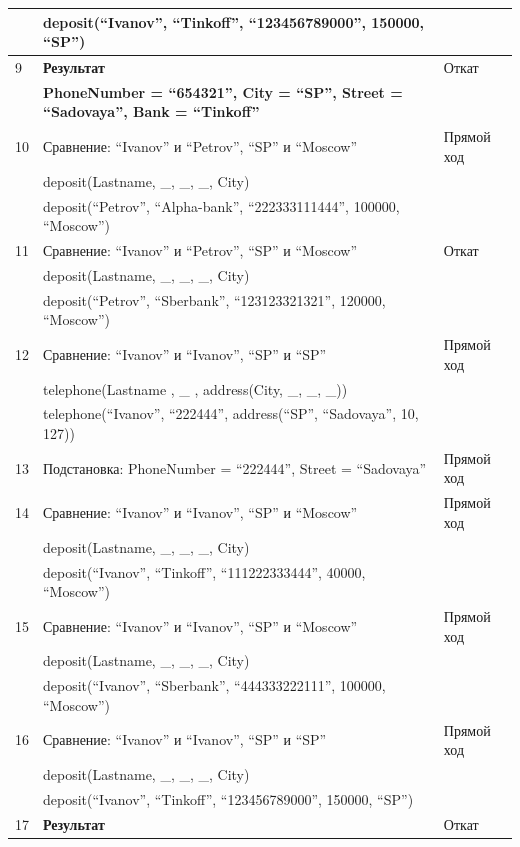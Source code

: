 {\begin{longtable}{|p{1.15cm}|p{8cm}|p{8cm}|}
      & deposit(``Ivanov'', ``Tinkoff'', ``123456789000'', 150000, ``SP'') & \\
    \hline
    9 & \textbf{Результат} & Откат \\
      & \textbf{PhoneNumber = ``654321'', City = ``SP'', Street = ``Sadovaya'', Bank = ``Tinkoff''} & \\
    \hline
    10 & Сравнение: ``Ivanov'' и ``Petrov'', ``SP'' и ``Moscow'' & Прямой ход \\
      & deposit(Lastname, \_, \_, \_, City) & \\
      & deposit(``Petrov'', ``Alpha-bank'', ``222333111444'', 100000, ``Moscow'') & \\
    \hline
    11 & Сравнение: ``Ivanov'' и ``Petrov'', ``SP'' и ``Moscow'' & Откат \\
      & deposit(Lastname, \_, \_, \_, City) & \\
      & deposit(``Petrov'', ``Sberbank'', ``123123321321'', 120000, ``Moscow'') & \\
    \hline
    12 & Сравнение: ``Ivanov'' и ``Ivanov'', ``SP'' и ``SP'' & Прямой ход \\
      & telephone(Lastname , \_ , address(City, \_, \_, \_)) & \\
      & telephone(``Ivanov'', ``222444'', address(``SP'', ``Sadovaya'', 10, 127)) & \\
    \hline
    13 & Подстановка: PhoneNumber = ``222444'', Street = ``Sadovaya'' & Прямой ход \\
    \hline
    14 & Сравнение: ``Ivanov'' и ``Ivanov'', ``SP'' и ``Moscow'' & Прямой ход \\
      & deposit(Lastname, \_, \_, \_, City) & \\
      & deposit(``Ivanov'', ``Tinkoff'', ``111222333444'', 40000, ``Moscow'') & \\
    \hline
    15 & Сравнение: ``Ivanov'' и ``Ivanov'', ``SP'' и ``Moscow'' & Прямой ход \\
      & deposit(Lastname, \_, \_, \_, City) & \\
      & deposit(``Ivanov'', ``Sberbank'', ``444333222111'', 100000, ``Moscow'') & \\
    \hline
    16 & Сравнение: ``Ivanov'' и ``Ivanov'', ``SP'' и ``SP'' & Прямой ход \\
      & deposit(Lastname, \_, \_, \_, City) & \\
      & deposit(``Ivanov'', ``Tinkoff'', ``123456789000'', 150000, ``SP'') & \\
    \hline
    17 & \textbf{Результат} & Откат \\

\end{longtable}}

